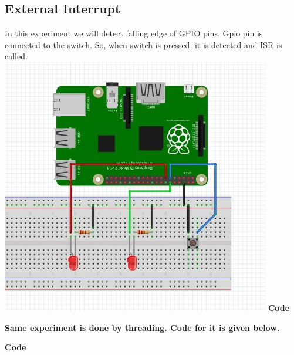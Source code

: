 \documentclass[11pt,a4paper]{article}
\begin{document}
	\subsection{External Interrupt}
	In this experiment we will detect falling edge of GPIO pins. Gpio pin is connected to the switch. So, when switch is pressed, it is detected and ISR is called.\\
	\centering
	\includegraphics[scale = 0.6]{switch_interrupt}
	\flushleft
	\textbf{Code}
	\vspace{0.3cm}
	
	\newpage
	\textbf{Same experiment is done by threading. Code for it is given below.} \\
	\vspace{5mm}
	
	\textbf{Code}
	\vspace{0.3cm}
	
	
\end{document}
